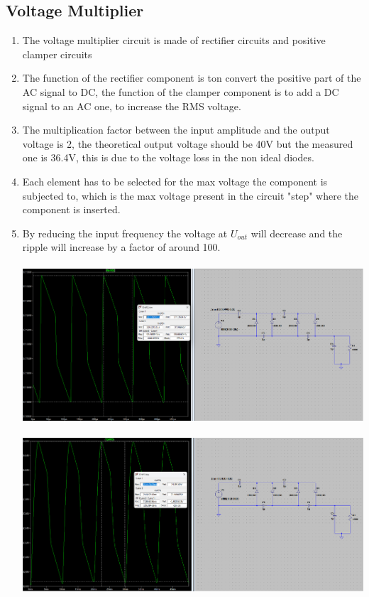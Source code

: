 \documentclass{article}
\begin{document}
			\subsection{Voltage Multiplier}
				\begin{enumerate}
					\item The voltage multiplier circuit is made of rectifier circuits and positive clamper circuits
					\item The function of the rectifier component is ton convert the positive part of the AC signal to DC, the function of the clamper component is to add a DC signal to an AC one, to increase the RMS voltage.
					\item The multiplication factor between the input amplitude and the output voltage is 2, the theoretical output voltage should be 40V but the measured one is 36.4V, this is due to the voltage loss in the non ideal diodes.
					\item Each element has to be selected for the max voltage the component is subjected to, which is the max voltage present in the circuit "step" where the component is inserted.
					\item By reducing the input frequency the voltage at \(U_{out}\) will decrease and the ripple will increase by a factor of around 100.\\\\
					\includegraphics[scale=0.35]{multiplier 10k}\\\\
					\includegraphics[scale=0.35]{multiplier 100}
				\end{enumerate}
			
				
				
				
				
				
				
				
				
		
				
\end{document}
